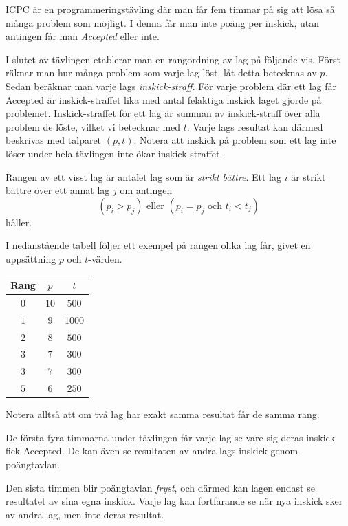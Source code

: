 
ICPC är en programmeringstävling där man får fem timmar på sig att lösa så många problem som möjligt.
I denna får man inte poäng per inskick, utan antingen får man \textit{Accepted} eller inte.

I slutet av tävlingen etablerar man en rangordning av lag på följande vis.
Först räknar man hur många problem som varje lag löst, låt detta betecknas av $p$.
Sedan beräknar man varje lags \textit{inskick-straff}.
För varje problem där ett lag får Accepted är inskick-straffet lika med antal felaktiga inskick laget gjorde på problemet.
Inskick-straffet för ett lag är summan av inskick-straff över alla problem de löste, vilket vi betecknar med $t$.
Varje lags resultat kan därmed beskrivas med talparet $(p,t)$.
Notera att inskick på problem som ett lag inte löser under hela tävlingen inte ökar inskick-straffet.

Rangen av ett visst lag är antalet lag som är \textit{strikt bättre}.
Ett lag $i$ är strikt bättre över ett annat lag $j$ om antingen
$$(p_i>p_j) \text{ eller } (p_i=p_j \text{ och } t_i < t_j)$$
håller.

I nedanstående tabell följer ett exempel på rangen olika lag får, givet en uppsättning $p$ och $t$-värden.

\begin{center}
\noindent
\begin{tabular}{| c | c | c |}
  \hline
  Rang & $p$ & $t$ \\ \hline
  $0$ & $10$ & $500$ \\ \hline
  $1$ & $9$ & $1000$ \\ \hline
  $2$ & $8$ & $500$ \\ \hline
  $3$ & $7$ & $300$ \\ \hline
  $3$ & $7$ & $300$ \\ \hline
  $5$ & $6$ & $250$ \\ \hline
\end{tabular}
\end{center}

Notera alltså att om två lag har exakt samma resultat får de samma rang.

De första fyra timmarna under tävlingen får varje lag se vare sig deras inskick fick Accepted.
De kan även se resultaten av andra lags inskick genom poängtavlan.

Den sista timmen blir poängtavlan \textit{fryst}, och därmed kan lagen endast se resultatet av sina egna inskick.
Varje lag kan fortfarande se när nya inskick sker av andra lag, men inte deras resultat.

